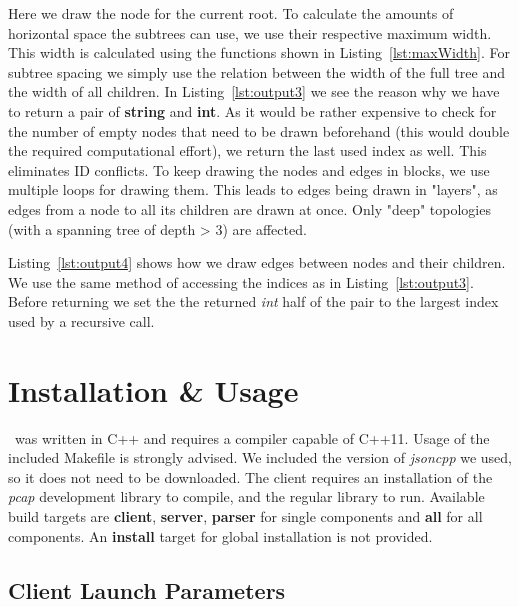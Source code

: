 
Here we draw the node for the current root.
To calculate the amounts of horizontal space the subtrees can use, we use their respective maximum width.
This width is calculated using the functions shown in Listing~\ref{lst:maxWidth}.
For subtree spacing we simply use the relation between the width of the full tree and the width of all children.
In Listing~\ref{lst:output3} we see the reason why we have to return a pair of \textbf{string} and \textbf{int}.
As it would be rather expensive to check for the number of empty nodes that need to be drawn beforehand (this would double the required computational effort), we return the last used index as well.
This eliminates ID conflicts.
To keep drawing the nodes and edges in blocks, we use multiple loops for drawing them.
This leads to edges being drawn in "layers", as edges from a node to all its children are drawn at once.
Only "deep" topologies (with a spanning tree of depth > 3) are affected.%


Listing~\ref{lst:output4} shows how we draw edges between nodes and their children.
We use the same method of accessing the indices as in Listing~\ref{lst:output3}.
Before returning we set the the returned \textit{int} half of the pair to the largest index used by a recursive call.



\section{Installation \& Usage}
\tool\ was written in C++ and requires a compiler capable of C++11.
Usage of the included Makefile is strongly advised.
We included the version of \textit{jsoncpp} we used, so it does not need to be downloaded.
The client requires an installation of the \textit{pcap} development library to compile, and the regular library to run.
Available build targets are \textbf{client}, \textbf{server}, \textbf{parser} for single components and \textbf{all} for all components.
An \textbf{install} target for global installation is not provided.
\subsection*{Client Launch Parameters}
